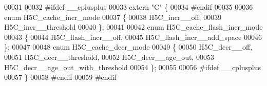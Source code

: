 \begin{DoxyCode}
00031 
00032 \textcolor{preprocessor}{#ifdef \_\_cplusplus}
00033 \textcolor{keyword}{extern} \textcolor{stringliteral}{"C"} \{
00034 \textcolor{preprocessor}{#endif}
00035 
00036 \textcolor{keyword}{enum} H5C\_cache\_incr\_mode
00037 \{
00038     H5C\_incr\_\_off,
00039     H5C\_incr\_\_threshold
00040 \};
00041 
00042 \textcolor{keyword}{enum} H5C\_cache\_flash\_incr\_mode
00043 \{
00044      H5C\_flash\_incr\_\_off,
00045      H5C\_flash\_incr\_\_add\_space
00046 \};
00047 
00048 \textcolor{keyword}{enum} H5C\_cache\_decr\_mode
00049 \{
00050     H5C\_decr\_\_off,
00051     H5C\_decr\_\_threshold,
00052     H5C\_decr\_\_age\_out,
00053     H5C\_decr\_\_age\_out\_with\_threshold
00054 \};
00055 
00056 \textcolor{preprocessor}{#ifdef \_\_cplusplus}
00057 \}
00058 \textcolor{preprocessor}{#endif}
00059 \textcolor{preprocessor}{#endif}
\end{DoxyCode}
